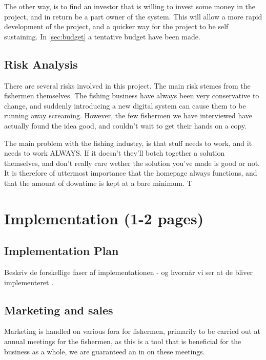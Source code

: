 \documentclass[a4paper,10pt,dateno,oneside,fleqn,sigleft]{newlfm} %
\begin{document}
\begin{newlfm}
The other way, is to find an investor that is willing to invest some money in the project, and in return be a part owner of the system. This will allow a more rapid development of the project, and a quicker way for the project to be self sustaining. In \ref{sec:budget} a tentative budget have been made.

\subsection{Risk Analysis}
There are several risks involved in this project. The main risk stemes from the fishermen themselves. The fishing business have always been very conservative to change, and suddenly introducing a new digital system can cause them to be running away screaming. However, the few fishermen we have interviewed have actually found the idea good, and couldn't wait to get their hands on a copy. 

The main problem with the fishing industry, is that stuff needs to work, and it needs to work ALWAYS. If it doesn't they'll botch together a solution themselves, and don't really care wether the solution you've made is good or not. It is therefore of uttermost importance that the homepage always functions, and that the amount of downtime is kept at a bare minimum. T


\section{Implementation (1-2 pages)}
\subsection{Implementation Plan}
Beskriv de forskellige faser af implementationen - og hvornår vi ser at de bliver implementeret .

\subsection{Marketing and sales}
Marketing is handled on various fora for fishermen, primarily to be carried out at annual meetings for the fishermen, as this is a tool that is beneficial for the business as a whole, we are guaranteed an in on these meetings. 



\end{newlfm}
\end{document}
